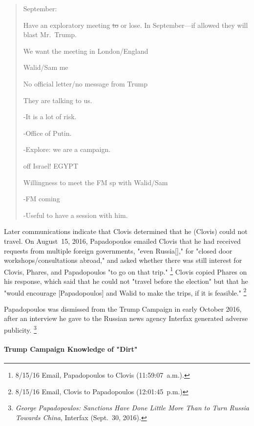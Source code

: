 \begin{quote}
September:

Have an exploratory meeting \sout{to} or lose.
In September---if allowed they will blast Mr.~Trump.

We want the meeting in London/England

Walid/Sam me

No official letter/no message from Trump

They are talking to us.

-It is a lot of risk.

-Office of Putin.

-Explore: we are a campaign.

off Israel! EGYPT

Willingness to meet the FM sp with Walid/Sam

-FM coming

-Useful to have a session with him.
\end{quote}

Later communications indicate that Clovis determined that he (Clovis) could not travel.
On August~15, 2016, Papadopoulos emailed Clovis that he had received requests from multiple foreign governments, "even Russia[]," for "closed door workshops/consultations abroad," and asked whether there was still interest for Clovis, Phares, and Papadopoulos "to go on that trip."%
\footnote{8/15/16 Email, Papadopoulos to Clovis (11:59:07~a.m.).}
Clovis copied Phares on his response, which said that he could not "travel before the election" but that he "would encourage [Papadopoulos] and Walid to make the trips, if it is feasible."%
\footnote{8/15/16 Email, Clovis to Papadopoulos (12:01:45~p.m.)}

Papadopoulos was dismissed from the Trump Campaign in early October 2016, after an interview he gave to the Russian news agency Interfax generated adverse publicity.%
\footnote{\textit{George Papadopoulos: Sanctions Have Done Little More Than to Turn Russia Towards China}, Interfax (Sept.~30, 2016).}

\paragraph{Trump Campaign Knowledge of "Dirt"}

